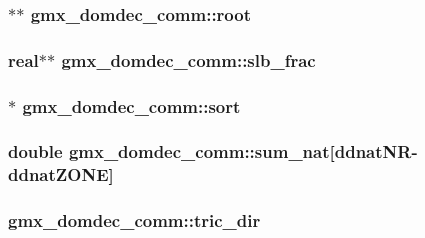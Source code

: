 \hypertarget{structgmx__domdec__comm_a6dccc23518ddea8b2b1192bdfe8f98d8}{
\subsubsection[{root}]{$\ast$$\ast$ {\bf gmx\-\_\-domdec\-\_\-comm\-::root}}}\label{structgmx__domdec__comm_a6dccc23518ddea8b2b1192bdfe8f98d8}
\hypertarget{structgmx__domdec__comm_ace3f205f68246f30b81a135ef1ae9e0d}{
\subsubsection[{slb\-\_\-frac}]{\setlength{\rightskip}{0pt plus 5cm}real$\ast$$\ast$ {\bf gmx\-\_\-domdec\-\_\-comm\-::slb\-\_\-frac}}}\label{structgmx__domdec__comm_ace3f205f68246f30b81a135ef1ae9e0d}
\hypertarget{structgmx__domdec__comm_ab12c2f6b195f3b56ba7364d71d2a1fef}{
\subsubsection[{sort}]{$\ast$ {\bf gmx\-\_\-domdec\-\_\-comm\-::sort}}}\label{structgmx__domdec__comm_ab12c2f6b195f3b56ba7364d71d2a1fef}
\hypertarget{structgmx__domdec__comm_a35fa9c9117734b33d59e9c54973780f5}{
\subsubsection[{sum\-\_\-nat}]{\setlength{\rightskip}{0pt plus 5cm}double {\bf gmx\-\_\-domdec\-\_\-comm\-::sum\-\_\-nat}\mbox{[}{\bf ddnat\-N\-R}-\/{\bf ddnat\-Z\-O\-N\-E}\mbox{]}}}\label{structgmx__domdec__comm_a35fa9c9117734b33d59e9c54973780f5}
\hypertarget{structgmx__domdec__comm_a0b16134c0ba7cb9f932b1c353742861c}{
\subsubsection[{tric\-\_\-dir}]{ {\bf gmx\-\_\-domdec\-\_\-comm\-::tric\-\_\-dir}}}\label{structgmx__domdec__comm_a0b16134c0ba7cb9f932b1c353742861c}
